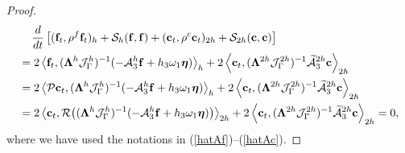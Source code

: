 \begin{proof}
\begin{align*}
&\hspace{0.4cm}\frac{d}{dt}\left[({\bf f}_t,\rho^f {\bf f}_t)_{h} + \mathcal{S}_{h}({\bf f},{\bf f}) + ({\bf c}_t,\rho^{c} {\bf c}_t)_{2h} + \mathcal{S}_{2h}({\bf c},{\bf c}) \right]   \nonumber\\
& = 2\left<{\bf f}_t,(\bm{\Lambda}^{h}\mathcal{J}^h_\Gamma)^{-1}(-\mathcal{A}_3^h{\bf f}+h_3\omega_1{\bm \eta})\right>_{h}+ 2\left<{\bf c}_t,(\bm{\Lambda}^{2h}\mathcal{J}^{2h}_\Gamma)^{-1}\widetilde{\mathcal{A}}_3^{2h}{\bf c}\right>_{2h} \nonumber\\
& = 2\left<{\mathcal{P}}{\bf c}_t,(\bm{\Lambda}^{h}\mathcal{J}^h_\Gamma)^{-1}(-\mathcal{A}_3^h{\bf f}+h_3\omega_1{\bm \eta})\right>_{h}+ 2\left<{\bf c}_t, (\bm{\Lambda}^{2h}\mathcal{J}^{2h}_\Gamma)^{-1}\widetilde{\mathcal{A}}_3^{2h}{\bf c}\right>_{2h} \nonumber\\
& = 2\left<{\bf c}_t,{\mathcal{R}}\big((\bm{\Lambda}^{h}\mathcal{J}^h_\Gamma)^{-1}(-\mathcal{A}_3^h{\bf f}+h_3\omega_1{\bm \eta})\big)\right>_{2h}+ 2\left<{\bf c}_t,(\bm{\Lambda}^{2h}\mathcal{J}^{2h}_\Gamma)^{-1}\widetilde{\mathcal{A}}_3^{2h}{\bf c}\right>_{2h} = 0,
\end{align*}
where we have used the notations in (\ref{hatAf})--(\ref{hatAc}).
\end{proof}